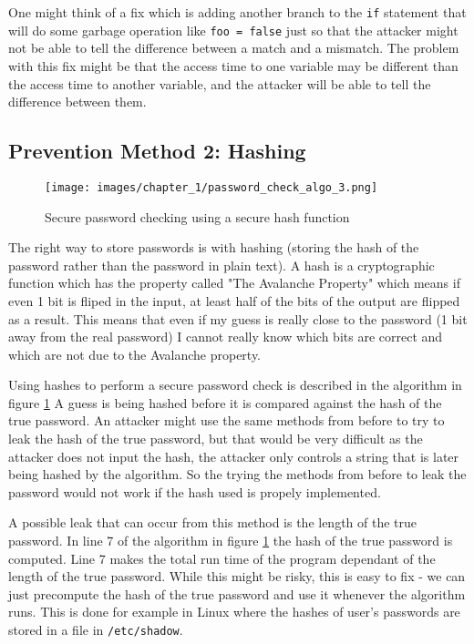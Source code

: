 One might think of a fix which is adding another branch to the \lstinline{if}
statement that will do some garbage operation like \lstinline{foo = false} just
so that the attacker might not be able to tell the difference between a match
and a mismatch. The problem with this fix might be that the access time to one
variable may be different than the access time to another variable, and the
attacker will be able to tell the difference between them.


\subsection{Prevention Method 2: Hashing}
\begin{figure}[H]
    
    \texttt{[image: images/chapter\_1/password\_check\_algo\_3.png]}
    \caption{Secure password checking using a secure hash function}
    \label{c1_fig_pass_check_3}
\end{figure}

The right way to store passwords is with hashing (storing the hash of the
password rather than the password in plain text). A hash is a cryptographic
function which has the property called "The Avalanche Property" which means if
even 1 bit is fliped in the input, at least half of the bits of the output are
flipped as a result. This means that even if my guess is really close to the
password (1 bit away from the real password) I cannot really know which bits are
correct and which are not due to the Avalanche property.

Using hashes to perform a secure password check is described in the algorithm in
figure \ref{c1_fig_pass_check_3} A guess is being hashed before it is compared
against the hash of the true password. An attacker might use the same methods
from before to try to leak the hash of the true password, but that would be very
difficult as the attacker does not input the hash, the attacker only controls a
string that is later being hashed by the algorithm. So the trying the methods
from before to leak the password would not work if the hash used is propely
implemented. 

A possible leak that can occur from this method is the length of the true
password. In line 7 of the algorithm in figure \ref{c1_fig_pass_check_3} the
hash of the true password is computed. Line 7 makes the total run time of the
program dependant of the length of the true password. While this might be risky,
this is easy to fix - we can just precompute the hash of the true password and
use it whenever the algorithm runs. This is done for example in Linux where the
hashes of user's passwords are stored in a file in \lstinline{/etc/shadow}.


